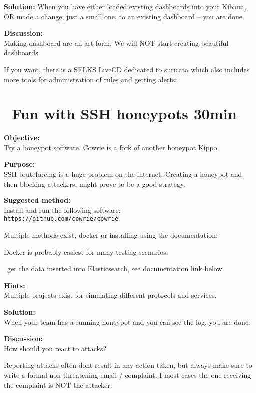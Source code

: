 \documentclass[a4paper,11pt,notitlepage]{report}
\begin{document}
{\bf Solution:}
When you have either loaded existing dashboards into your Kibana, OR made a change, just a small one, to an existing dashboard -- you are done.

{\bf Discussion:}\\
Making dashboard are an art form. We will NOT start creating beautiful dashboards.

If you want, there is a SELKS LiveCD dedicated to suricata which also includes more tools for administration of rules and getting alerts:\\




\chapter{\faInfoCircle\ Fun with SSH honeypots 30min}
\label{ex:ssh-honeypot}

{\bf Objective:}\\
Try a honeypot software. Cowrie is a fork of another honeypot Kippo.

{\bf Purpose:}\\
SSH bruteforcing is a huge problem on the internet. Creating a honeypot and then blocking attackers, might prove to be a good strategy.

{\bf Suggested method:}\\
Install and run the following software:\\
\verb+https://github.com/cowrie/cowrie+

Multiple methods exist, docker or installing using the documentation:\\

Docker is probably easiest for many testing scenarios.

\faInfoCircle\ get the data inserted into Elasticsearch, see documentation link below.

{\bf Hints:}\\
Multiple projects exist for simulating different protocols and services.

{\bf Solution:}\\
When your team has a running honeypot and you can see the log, you are done.

{\bf Discussion:}\\
How should you react to attacks?

Reporting attacks often dont result in any action taken, but always make sure to write a formal non-threatening email / complaint. I most cases the one receiving the complaint is NOT the attacker.
\end{document}
